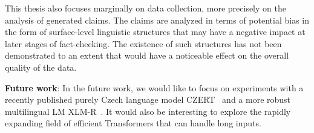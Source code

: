\begin{conclusion}
    
    
    
    This thesis also focuses marginally on data collection, more precisely on the analysis of generated claims. The claims are analyzed in terms of potential bias in the form of surface-level linguistic structures that may have a negative impact at later stages of fact-checking. The existence of such structures has not been demonstrated to an extent that would have a noticeable effect on the overall quality of the data.
    
    \noindent \textbf{Future work}:
    In the future work, we would like to focus on experiments with a recently published purely Czech language model CZERT~\parencite{sido2021czert} and a more robust multilingual LM XLM-R~\parencite{Conneau_2020}. 
    It would also be interesting to explore the rapidly expanding field of efficient Transformers that can handle long inputs.

\end{conclusion}